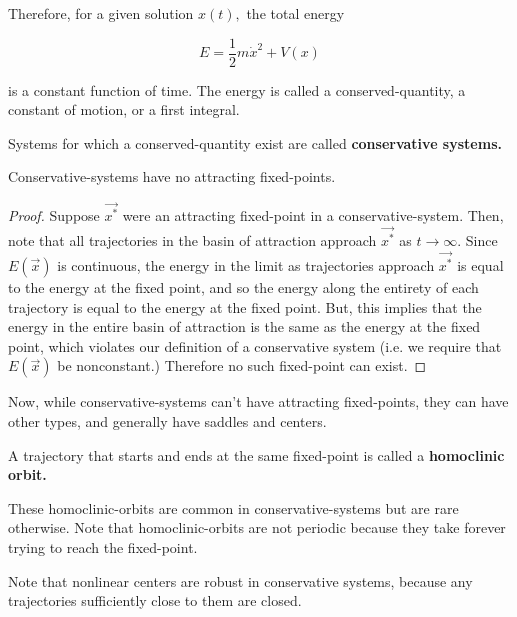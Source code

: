 \documentclass{article}
\begin{document}
Therefore, for a given solution $x(t),$ the total energy

\[ E = \frac{1}{2} m \dot{x}^2 + V(x) \]

is a constant function of time. The energy is called a \@{conserved-quantity}, a constant of motion, or a first integral.

\begin{definition}
Systems for which a \@{conserved-quantity} exist are called \textbf{conservative systems.}
\end{definition}

\begin{theorem}\label{conservative-systems-have-no-attracting-fixed-points}
\@{Conservative-systems} have no attracting \@{fixed-points}.
\end{theorem}

\begin{proof}
Suppose $\vec{x^*}$ were an attracting \@{fixed-point} in a \@{conservative-system}. Then, note that all \@{trajectories} in the basin of attraction approach $\vec{x^*}$ as $t \to \infty.$ Since $E(\vec{x})$ is continuous, the energy in the limit as trajectories approach $\vec{x^*}$ is equal to the energy at the fixed point, and so the energy along the entirety of each trajectory is equal to the energy at the fixed point. But, this implies that the energy in the entire basin of attraction is the same as the energy at the fixed point, which violates our definition of a conservative system (i.e. we require that $E(\vec{x})$ be nonconstant.) Therefore no such \@{fixed-point} can exist.
\end{proof}

Now, while \@{conservative-systems} can't have attracting \@{fixed-points}, they can have other types, and generally have \@{saddles} and \@{centers}.

\begin{definition}
A \@{trajectory} that starts and ends at the same \@{fixed-point} is called a \textbf{homoclinic orbit.}
\end{definition}

These \@{homoclinic-orbits} are common in \@{conservative-systems} but are rare otherwise. Note that \@{homoclinic-orbits} are not periodic because they take forever trying to reach the \@{fixed-point}.

Note that nonlinear \@{centers} are robust in conservative systems, because any trajectories sufficiently close to them are closed.
\end{document}
